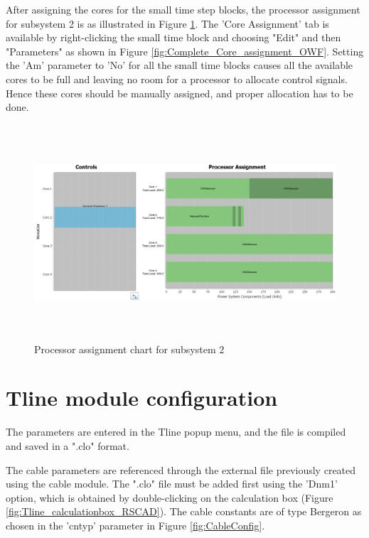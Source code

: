 After assigning the cores for the small time step blocks, the processor assignment for subsystem 2 is as illustrated in Figure \ref{fig:subsystem2_processor}. The 'Core Assignment' tab is available by right-clicking the small time block and choosing "Edit" and then "Parameters" as shown in Figure \ref{fig:Complete_Core_assignment_OWF}. Setting the 'Am' parameter to 'No' for all the small time blocks causes all the available cores to be full and leaving no room for a processor to allocate control signals. Hence these cores should be manually assigned, and proper allocation has to be done.

\begin{figure}[H]
\centering
    \includegraphics[height = 8cm,width = 17cm]{Diagrams/Chapter_4/subsystem2_processor.PNG}
    \caption{Processor assignment chart for subsystem 2}
    \label{fig:subsystem2_processor}
\end{figure}


\section{Tline module configuration}\label{config_Tline}
The parameters are entered in the Tline popup menu, and the file is compiled and saved in a ".clo" format.

The cable parameters are referenced through the external file previously created using the cable module. %
The ".clo" file must be added first using the 'Dnm1' option, which is obtained by double-clicking on the calculation box (Figure \ref{fig:Tline_calculationbox_RSCAD}). The cable constants are of type Bergeron as chosen in the 'cntyp' parameter in Figure \ref{fig:CableConfig}.


